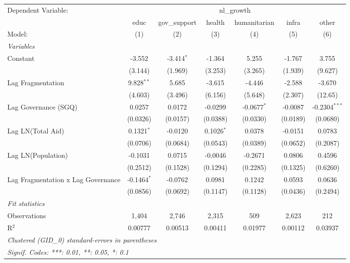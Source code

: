 \begingroup
\centering
\begin{tabular}{lcccccc}
   \tabularnewline \midrule \midrule
   Dependent Variable: & \multicolumn{6}{c}{nl\_growth}\\
                                      & educ          & gov\_support  & health       & humanitarian  & infra    & other \\   
   Model:                             & (1)           & (2)           & (3)          & (4)           & (5)      & (6)\\  
   \midrule
   \emph{Variables}\\
   Constant                           & -3.552        & -3.414$^{*}$  & -1.364       & 5.255         & -1.767   & 3.755\\   
                                      & (3.144)       & (1.969)       & (3.253)      & (3.265)       & (1.939)  & (9.627)\\   
   Lag Fragmentation                  & 9.828$^{**}$  & 5.685         & -3.615       & -4.446        & -2.588   & -3.670\\   
                                      & (4.603)       & (3.496)       & (6.156)      & (5.648)       & (2.307)  & (12.65)\\   
   Lag Governance (SGQ)               & 0.0257        & 0.0172        & -0.0299      & -0.0677$^{*}$ & -0.0087  & -0.2304$^{***}$\\   
                                      & (0.0326)      & (0.0157)      & (0.0388)     & (0.0330)      & (0.0189) & (0.0680)\\   
   Lag LN(Total Aid)                  & 0.1321$^{*}$  & -0.0120       & 0.1026$^{*}$ & 0.0378        & -0.0151  & 0.0783\\   
                                      & (0.0706)      & (0.0684)      & (0.0543)     & (0.0389)      & (0.0652) & (0.2087)\\   
   Lag LN(Population)                 & -0.1031       & 0.0715        & -0.0046      & -0.2671       & 0.0806   & 0.4596\\   
                                      & (0.2512)      & (0.1528)      & (0.1294)     & (0.2285)      & (0.1325) & (0.6260)\\   
   Lag Fragmentation x Lag Governance & -0.1464$^{*}$ & -0.0762       & 0.0981       & 0.1242        & 0.0593   & 0.0636\\   
                                      & (0.0856)      & (0.0692)      & (0.1147)     & (0.1128)      & (0.0436) & (0.2494)\\   
   \midrule
   \emph{Fit statistics}\\
   Observations                       & 1,404         & 2,746         & 2,315        & 509           & 2,623    & 212\\  
   R$^2$                              & 0.00777       & 0.00513       & 0.00411      & 0.01977       & 0.00112  & 0.03937\\  
   \midrule \midrule
   \multicolumn{7}{l}{\emph{Clustered (GID\_0) standard-errors in parentheses}}\\
   \multicolumn{7}{l}{\emph{Signif. Codes: ***: 0.01, **: 0.05, *: 0.1}}\\
\end{tabular}
